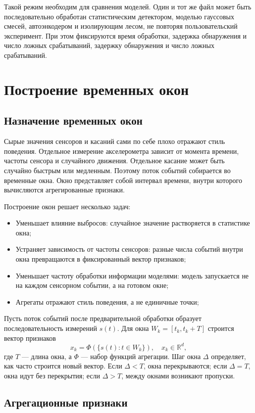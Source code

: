 \documentclass[oneside,senior,etd]{BYUPhys}
\begin{document}
Такой режим необходим для сравнения моделей. Один и тот же файл может быть последовательно обработан статистическим детектором, моделью гауссовых смесей, автоэнкодером и изолирующим лесом, не повторяя пользовательский эксперимент. При этом фиксируются время обработки, задержка обнаружения и число ложных срабатываний, задержку обнаружения и число ложных срабатываний.

\section{Построение временных окон}

\subsection{Назначение временных окон}

Сырые значения сенсоров и касаний сами по себе плохо отражают стиль поведения. Отдельное измерение акселерометра зависит от момента времени, частоты сенсора и случайного движения. Отдельное касание может быть случайно быстрым или медленным. Поэтому поток событий собирается во временные окна. Окно представляет собой интервал времени, внутри которого вычисляются агрегированные признаки.

Построение окон решает несколько задач:
\begin{itemize}
	\item Уменьшает влияние выбросов: случайное значение растворяется в статистике окна;
	\item Устраняет зависимость от частоты сенсоров: разные числа событий внутри окна превращаются в фиксированный вектор признаков;
	\item Уменьшает частоту обработки информации моделями: модель запускается не на каждом сенсорном событии, а на готовом окне;
	\item Агрегаты отражают стиль поведения, а не единичные точки;
\end{itemize}

Пусть поток событий после предварительной обработки образует последовательность измерений $s(t)$. Для окна $W_k=[t_k,t_k+T]$ строится вектор признаков
\[
    x_k = \Phi(\{s(t): t \in W_k\}), \quad x_k \in \mathbb{R}^{d},
\]
где $T$ --- длина окна, а $\Phi$ --- набор функций агрегации. Шаг окна $\Delta$ определяет, как часто строится новый вектор. Если $\Delta<T$, окна перекрываются; если $\Delta=T$, окна идут без перекрытия; если $\Delta>T$, между окнами возникают пропуски.

\subsection{Агрегационные признаки}
\end{document}
